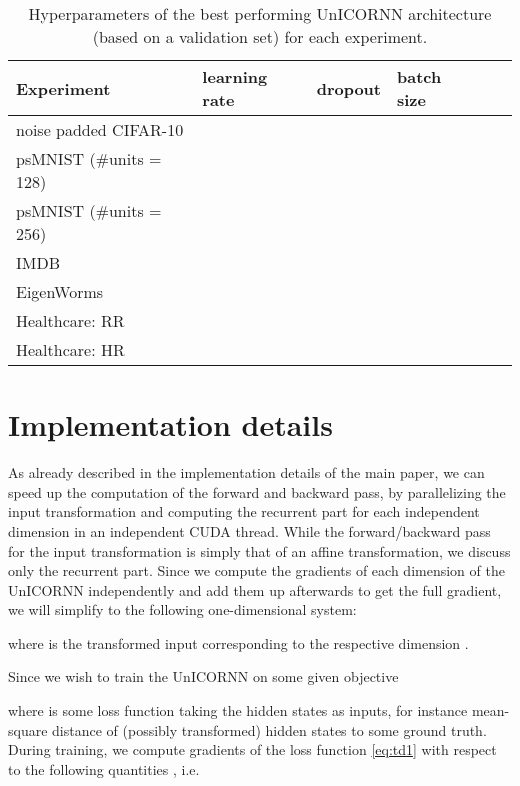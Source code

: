 \documentclass{article}
\begin{document}
\begin{table}[h!]
  \caption{Hyperparameters of the best performing UnICORNN architecture (based on a validation set) for each experiment.}
  \label{tab:nets}
  \centering
  \begin{tabular}{llllll}
    \toprule
    \cmidrule(r){1-6}
    Experiment & learning rate & dropout & batch size &  &  \\
    \midrule
    noise padded CIFAR-10 &  &  &  &  & \\
    psMNIST (\#units = 128) &  &  & &  & \\
    psMNIST (\#units = 256) &  &  &  &  &  \\
    IMDB &  &  &  &  & \\
    EigenWorms  &  &  &  &  &  \\
    Healthcare: RR  &  &  &  &  &  \\
    Healthcare: HR  &   &  &  &  &  \\
    

    \bottomrule
  \end{tabular}
\end{table}



\section{Implementation details}
As already described in the implementation details of the main paper, we can speed up the computation of the forward and backward pass, by parallelizing the input transformation and computing the recurrent part for each independent dimension in an independent CUDA thread. While the forward/backward pass for the input transformation is simply that of an affine transformation, we discuss only the recurrent part. Since we compute the gradients of each dimension of the UnICORNN independently and add them up afterwards to get the full gradient, we will simplify to the following one-dimensional system:


where  is the transformed input corresponding to the respective dimension .

Since we wish to train the UnICORNN on some given objective

where  is some loss function taking the hidden states  as inputs, for instance mean-square distance of (possibly transformed) hidden states  to some ground truth. During training, we compute gradients of the loss function \eqref{eq:td1} with respect to the following quantities , i.e.
\end{document}
